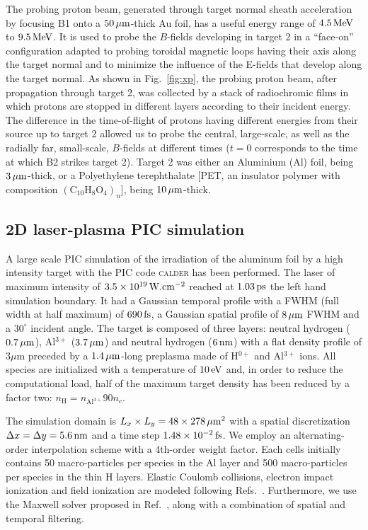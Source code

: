 \documentclass[aps,twocolumn,showpacs,superscriptaddress]{revtex4}
\begin{document}
The probing proton beam, generated through target normal sheath acceleration \cite{PRL_Fuchs_2003} by focusing B1 onto a $50\,\rm \mu m$-thick Au foil, has a useful energy range of $4.5\,\rm MeV$ to $9.5\,\rm MeV$. It is used to probe the $B$-fields developing in target 2 in a ``face-on'' configuration \cite{RSI_Albertazzi_2015} adapted to probing toroidal magnetic loops having their axis along the target normal and to minimize the influence of the E-fields that develop along the target normal. As shown in Fig.~\ref{fig:xp}, the probing proton beam, after propagation through target 2, was collected by a stack of radiochromic films in which protons are stopped in different layers according to their incident energy. The difference in the time-of-flight of protons having different energies from their source up to target 2 allowed us to probe the central, large-scale, as well as the radially far, small-scale, $B$-fields at different times ($t=0$ corresponds to the time at which B2 strikes target 2).
Target 2 was either an Aluminium (Al) foil, being $3\,\rm \mu m$-thick, or a Polyethylene terephthalate [PET, an insulator polymer with composition $(\mathrm{C}_{10}\mathrm{H}_8\mathrm{O}_4)_n$], being $10\,\rm \mu m$-thick.
 
\subsection*{2D laser-plasma PIC simulation}

A large scale PIC simulation of the irradiation of the aluminum foil by a high intensity target with the PIC code \textsc{calder} has been performed.
The laser of maximum intensity of $3.5 \times 10^{19}\,\rm W.cm^{-2}$ reached at $1.03\,\rm ps$ the left hand simulation boundary. It had a Gaussian temporal profile with a FWHM (full width at half maximum) of $690\,\rm fs$,  a Gaussian spatial profile of $8\,\rm \mu m$ FWHM and a $30^\circ$ incident angle. The target is composed of three layers: neutral hydrogen ($0.7\,\rm \mu m$), Al$^{3+}$ ($3.7\,\rm \mu m$) and neutral hydrogen ($6\,\rm nm$) with a flat density profile of $3 \mu$m preceded by a $1.4\,\rm \mu m$-long preplasma made of H$^{0+}$ and Al$^{3+}$ ions. All species are initialized with a temperature of $10\,\rm eV$ and, in order to reduce the computational load, half of the maximum target density has been reduced by a factor two: $n_\mathrm{H} = n_{\mathrm{Al}^{3+}}90 n_c$.

The simulation domain is $L_x\times L_y = 48 \times 278\,\rm \mu m^2$ with a spatial discretization $\Delta x = \Delta y = 5.6\,\rm nm$ and a time step
$1.48\times 10^{-2}\,\rm fs$. We employ an alternating-order interpolation scheme \cite{CPC_Sokolov_2013} with a 4th-order weight factor. Each cells initially contains
50 macro-particles per species in the Al layer and 500 macro-particles per species in the thin H layers. Elastic Coulomb collisions, electron impact
ionization and field ionization are modeled following Refs.~\cite{POP_Perez_2012}. Furthermore, we use the Maxwell solver proposed in Ref.~\cite{PRSTAB_Lehe_2013}, along with a combination of spatial \cite{JCP_Vay_2011} and temporal \cite{JCP_Friedman_1990} filtering.
\end{document}
